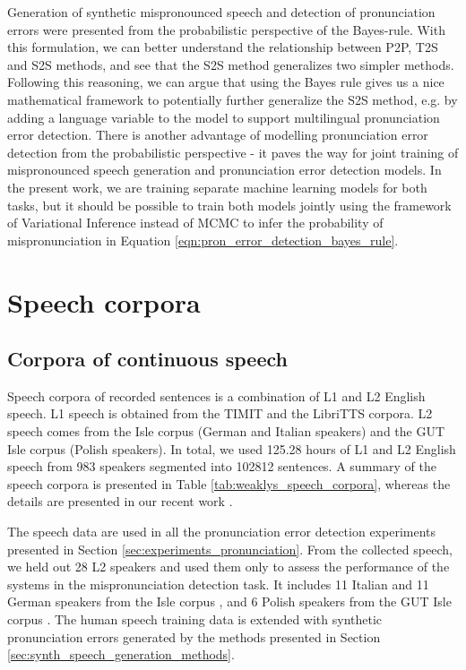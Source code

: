 \documentclass[]{interact}
\theoremstyle{plain}%
\theoremstyle{definition}
\theoremstyle{remark}
\begin{document}
Generation of synthetic mispronounced speech and detection of pronunciation errors were presented from the probabilistic perspective of the Bayes-rule. With this formulation, we can better understand the relationship between P2P, T2S and S2S methods, and see that the S2S method generalizes two simpler methods. Following this reasoning, we can argue that using the Bayes rule gives us a nice mathematical framework to potentially further generalize the S2S method, e.g. by adding a language variable to the model to support multilingual pronunciation error detection. There is another advantage of modelling pronunciation error detection from the probabilistic perspective - it paves the way for joint training of mispronounced speech generation and pronunciation error detection models. In the present work, we are training separate machine learning models for both tasks, but it should be possible to train both models jointly using the framework of Variational Inference \cite{jordan1999introduction} instead of MCMC to infer the probability of mispronunciation in Equation \ref{eqn:pron_error_detection_bayes_rule}.

\section{Speech corpora}
\label{sec:human_speech_corpora}

\subsection{Corpora of continuous speech}

Speech corpora of recorded sentences is a combination of L1 and L2 English speech. L1 speech is obtained from the TIMIT \cite{garofolo1993darpa} and the LibriTTS \cite{Zen2019} corpora. L2 speech comes from the Isle \cite{atwell2003isle} corpus (German and Italian speakers) and the GUT Isle \cite{Weber2020} corpus (Polish speakers). In total, we used 125.28 hours of L1 and L2 English speech from 983 speakers segmented into 102812 sentences. A summary of the speech corpora is presented in Table \ref{tab:weaklys_speech_corpora}, whereas the details are presented in our recent work \cite{korzekwa21b_interspeech}.

The speech data are used in all the pronunciation error detection experiments presented in Section \ref{sec:experiments_pronunciation}. From the collected speech, we held out 28 L2 speakers and used them only to assess the performance of the systems in the mispronunciation detection task. It includes 11 Italian and 11 German speakers from the Isle corpus \cite{atwell2003isle}, and 6 Polish speakers from the GUT Isle corpus \cite{Weber2020}. The human speech training data is extended with synthetic pronunciation errors generated by the methods presented in Section \ref{sec:synth_speech_generation_methods}. 
\end{document}
